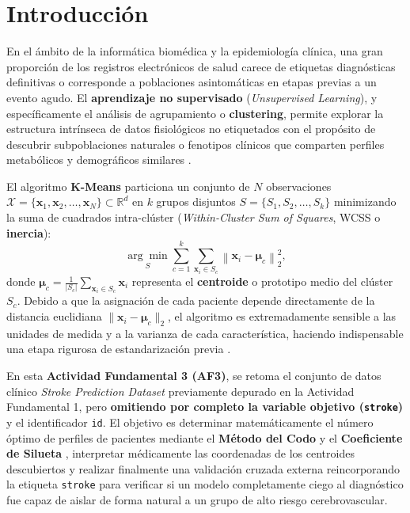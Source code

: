
\section{Introducción}

En el ámbito de la informática biomédica y la epidemiología clínica, una gran proporción de los registros electrónicos de salud carece de etiquetas diagnósticas definitivas o corresponde a poblaciones asintomáticas en etapas previas a un evento agudo. El \textbf{aprendizaje no supervisado} (\textit{Unsupervised Learning}), y específicamente el análisis de agrupamiento o \textbf{clustering}, permite explorar la estructura intrínseca de datos fisiológicos no etiquetados con el propósito de descubrir subpoblaciones naturales o fenotipos clínicos que comparten perfiles metabólicos y demográficos similares \cite{Hastie2009, MacQueen1967}.

El algoritmo \textbf{K-Means} \cite{MacQueen1967, Lloyd1982} particiona un conjunto de $N$ observaciones $\mathcal{X} = \{\mathbf{x}_1, \mathbf{x}_2, \dots, \mathbf{x}_N\} \subset \mathbb{R}^d$ en $k$ grupos disjuntos $S = \{S_1, S_2, \dots, S_k\}$ minimizando la suma de cuadrados intra-clúster (\textit{Within-Cluster Sum of Squares}, WCSS o \textbf{inercia}):
\begin{equation}
    \underset{S}{\arg\min} \sum_{c=1}^{k} \sum_{\mathbf{x}_i \in S_c} \left\| \mathbf{x}_i - \boldsymbol{\mu}_c \right\|_2^2,
    \label{eq:kmeans_inertia}
\end{equation}
donde $\boldsymbol{\mu}_c = \frac{1}{|S_c|} \sum_{\mathbf{x}_i \in S_c} \mathbf{x}_i$ representa el \textbf{centroide} o prototipo medio del clúster $S_c$. Debido a que la asignación de cada paciente depende directamente de la distancia euclidiana $\|\mathbf{x}_i - \boldsymbol{\mu}_c\|_2$, el algoritmo es extremadamente sensible a las unidades de medida y a la varianza de cada característica, haciendo indispensable una etapa rigurosa de estandarización previa \cite{Hastie2009, Pedregosa2011}.

En esta \textbf{Actividad Fundamental 3 (AF3)}, se retoma el conjunto de datos clínico \textit{Stroke Prediction Dataset} \cite{Soriano2021} previamente depurado en la Actividad Fundamental 1, pero \textbf{omitiendo por completo la variable objetivo (\texttt{stroke})} y el identificador \texttt{id}. El objetivo es determinar matemáticamente el número óptimo de perfiles de pacientes mediante el \textbf{Método del Codo} y el \textbf{Coeficiente de Silueta} \cite{Rousseeuw1987}, interpretar médicamente las coordenadas de los centroides descubiertos y realizar finalmente una validación cruzada externa reincorporando la etiqueta \texttt{stroke} para verificar si un modelo completamente ciego al diagnóstico fue capaz de aislar de forma natural a un grupo de alto riesgo cerebrovascular.

